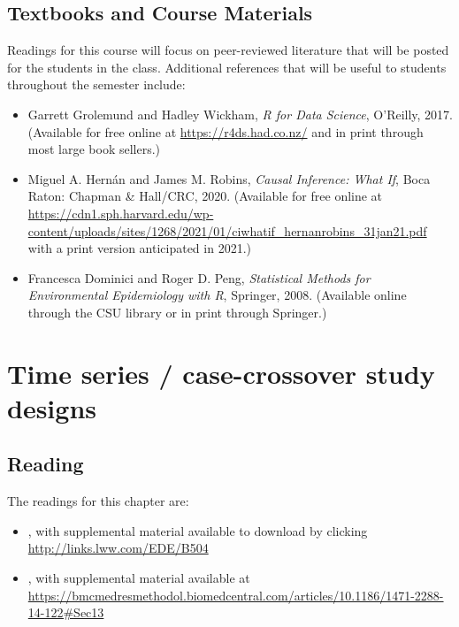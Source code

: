\documentclass[
]{book}
\providecommand{\tightlist}{%
  \setlength{\itemsep}{0pt}\setlength{\parskip}{0pt}}
\begin{document}
\hypertarget{textbooks-and-course-materials}{%
\section{Textbooks and Course Materials}\label{textbooks-and-course-materials}}

Readings for this course will focus on peer-reviewed literature that will be
posted for the students in the class. Additional references that will be useful
to students throughout the semester include:

\begin{itemize}
\tightlist
\item
  Garrett Grolemund and Hadley Wickham, \emph{R for Data Science}, O'Reilly, 2017. (Available for free online at \url{https://r4ds.had.co.nz/} and in print through
  most large book sellers.)
\item
  Miguel A. Hernán and James M. Robins, \emph{Causal Inference: What If}, Boca Raton: Chapman \& Hall/CRC, 2020. (Available for free online at \url{https://cdn1.sph.harvard.edu/wp-content/uploads/sites/1268/2021/01/ciwhatif_hernanrobins_31jan21.pdf} with a print version anticipated in 2021.)
\item
  Francesca Dominici and Roger D. Peng, \emph{Statistical Methods for Environmental Epidemiology with R}, Springer, 2008. (Available online through the CSU library or in print through Springer.)
\end{itemize}

\hypertarget{time-series-case-crossover-study-designs}{%
\chapter{Time series / case-crossover study designs}\label{time-series-case-crossover-study-designs}}

\hypertarget{reading}{%
\section{Reading}\label{reading}}

The readings for this chapter are:

\begin{itemize}
\tightlist
\item
  \citet{vicedo2019hands}, with supplemental material available to download by
  clicking \url{http://links.lww.com/EDE/B504}
\item
  \citet{armstrong2014conditional}, with supplemental material available at
  \url{https://bmcmedresmethodol.biomedcentral.com/articles/10.1186/1471-2288-14-122\#Sec13}
\end{itemize}
\end{document}
